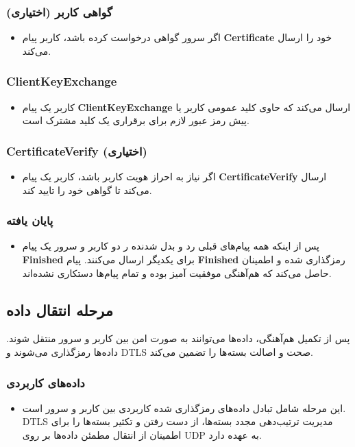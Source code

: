 \documentclass{report}
\begin{document}
\subsubsection*{گواهی کاربر (اختیاری)}
\begin{itemize}
	\item
	 اگر سرور گواهی درخواست کرده باشد، کاربر پیام \textbf{Certificate} خود را ارسال می‌کند.
\end{itemize}

\subsubsection*{ClientKeyExchange}
\begin{itemize}
	\item 
	کاربر یک پیام \textbf{ClientKeyExchange} ارسال می‌کند که حاوی کلید عمومی کاربر یا پیش رمز عبور لازم برای برقراری یک کلید مشترک است.
\end{itemize}

\subsubsection*{CertificateVerify (اختیاری)}
\begin{itemize}
	\item اگر نیاز به احراز هویت کاربر باشد، کاربر یک پیام \textbf{CertificateVerify} ارسال می‌کند تا گواهی خود را تایید کند.
\end{itemize}

\subsubsection*{پایان یافته}
\begin{itemize}
	\item
	 پس از اینکه همه پیام‌های قبلی رد و بدل شدنده ر دو کاربر و سرور یک پیام \textbf{Finished} برای یکدیگر ارسال می‌کنند. پیام \textbf{Finished} رمزگذاری شده و اطمینان حاصل می‌کند که هم‌آهنگی موفقیت آمیز بوده و تمام پیام‌ها دستکاری نشده‌اند.
\end{itemize}

\subsection*{مرحله انتقال داده}
پس از تکمیل هم‌آهنگی، داده‌ها می‌توانند به صورت امن بین کاربر و سرور منتقل شوند. داده‌ها رمزگذاری می‌شوند و DTLS صحت و اصالت بسته‌ها را تضمین می‌کند.
	
\subsubsection*{داده‌های کاربردی}
\begin{itemize}
	\item
	 این مرحله شامل تبادل داده‌های رمزگذاری شده کاربردی بین کاربر و سرور است. DTLS مدیریت ترتیب‌دهی مجدد بسته‌ها، از دست رفتن و تکثیر بسته‌ها را برای اطمینان از انتقال مطمئن داده‌ها بر روی UDP به عهده دارد.
\end{itemize}
\end{document}
